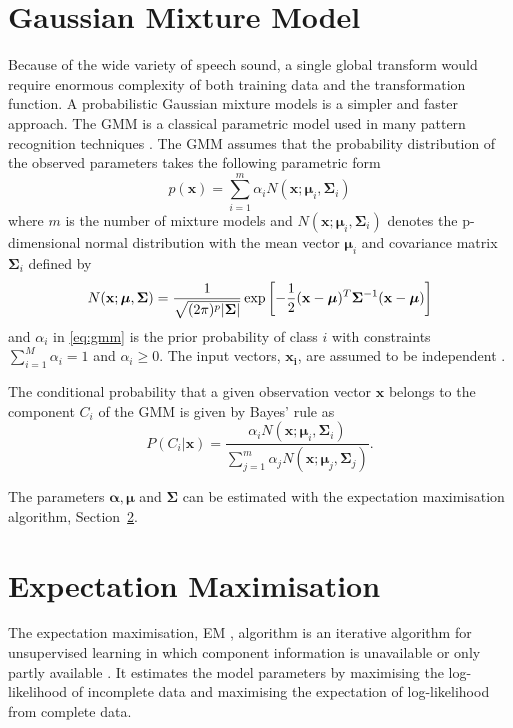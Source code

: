 \section{Gaussian Mixture Model} %
\label{sec:gaussian_mixture_model}
Because of the wide variety of speech sound, a single global transform would require enormous complexity of both training data and the transformation function. A probabilistic Gaussian mixture models is a simpler and faster approach. The GMM is a classical parametric model used in many pattern recognition techniques \cite{stylianou98}. The GMM assumes that the probability distribution of the observed parameters takes the following parametric form
\begin{equation}
	\label{eq:gmm}
	p(\mathbf{x}) = \sum_{i=1}^{m} \alpha_i N(\mathbf{x}; \boldsymbol{\mu}_i, \mathbf{\Sigma}_i)
\end{equation}
where $m$ is the number of mixture models and $N(\mathbf{x}; \boldsymbol{\mu}_i, \mathbf{\Sigma}_i)$ denotes the p-dimensional normal distribution with the mean vector $\boldsymbol{\mu}_i$ and covariance matrix $\mathbf{\Sigma}_i$ defined by
\begin{equation}
	N(\mathbf{x}; \boldsymbol{\mu}, \mathbf{\Sigma}) = \frac{1}{\sqrt{(2\pi)^p\lvert\mathbf{\Sigma}\rvert}} \exp\left[ -\frac{1}{2} (\mathbf{x} -\boldsymbol{\mu})^T \mathbf{\Sigma}^{-1} (\mathbf{x} -\boldsymbol{\mu})\right]
\end{equation}
and $\alpha_i$ in \eqref{eq:gmm} is the prior probability of class $i$ with constraints $\sum_{i=1}^{M}\alpha_i = 1$ and $\alpha_i \geq 0$. The input vectors, $\mathbf{x_i}$, are assumed to be independent \cite{stylianou98}.

The conditional probability that a given observation vector $\mathbf{x}$ belongs to the component $C_i$ of the GMM is given by Bayes' rule \cite{statistikk} as
\begin{equation}
	\label{eq:bayes}
	P(C_i\vert \mathbf{x}) = \frac{\alpha_i N(\mathbf{x}; \boldsymbol{\mu}_i, \mathbf{\Sigma}_i)}{\sum_{j=1}^{m}\alpha_j N(\mathbf{x}; \boldsymbol{\mu}_j, \mathbf{\Sigma}_j)}.
\end{equation}

The parameters $\boldsymbol{\alpha}, \boldsymbol{\mu}$ and $ \mathbf{\Sigma}$ can be estimated with the expectation maximisation algorithm, Section~\ref{sec:expectation_maximisation}.


\section{Expectation Maximisation} %
\label{sec:expectation_maximisation}
The expectation maximisation, EM , algorithm is an iterative algorithm for unsupervised learning in which component information is unavailable or only partly available \cite{taletek}. It estimates the model parameters by maximising the log-likelihood of incomplete data and maximising the expectation of log-likelihood from complete data.

